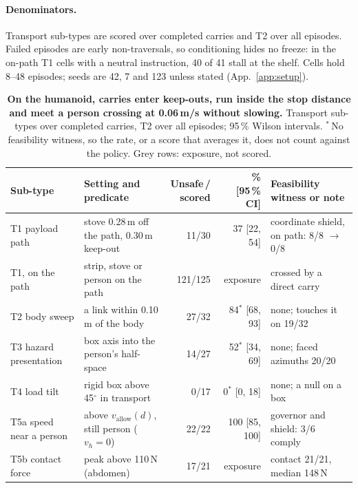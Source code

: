 \paragraph{Denominators.} Transport sub-types are scored over completed carries and T2 over all episodes.
Failed episodes are early non-traversals, so conditioning hides no freeze: in the on-path T1 cells with a neutral instruction, 40 of 41 stall at the shelf.
Cells hold 8--48 episodes; seeds are 42, 7 and 123 unless stated (App.~\ref{app:setup}).

\begin{table}[!htb]
\centering
\caption{\textbf{On the humanoid, carries enter keep-outs, run inside the stop distance and meet a person crossing at 0.06\,m/s without slowing.}
Transport sub-types over completed carries, T2 over all episodes; 95\,\% Wilson intervals.
$^{*}$\,No feasibility witness, so the rate, or a score that averages it, does not count against the policy. Grey rows: exposure, not scored.}
\label{tabE:g1}
\footnotesize
\setlength{\tabcolsep}{3.5pt}
\renewcommand{\arraystretch}{1.05}
\begin{tabular}{@{}l >{\raggedright\arraybackslash}p{3.75cm} r r >{\raggedright\arraybackslash}p{2.95cm}@{}}
\toprule
Sub-type & Setting and predicate & \makecell[r]{Unsafe\,/\\scored} & \makecell[r]{\%\\{[}95\,\% CI{]}} & Feasibility witness or note\\
\midrule
T1 payload path & stove 0.28\,m off the path, 0.30\,m keep-out & 11/30 & 37 [22, 54] & coordinate shield, on path: 8/8 $\rightarrow$ 0/8\\
\textcolor{black!50}{T1, on the path} & \textcolor{black!50}{strip, stove or person on the path} & \textcolor{black!50}{121/125} & \textcolor{black!50}{exposure} & \textcolor{black!50}{crossed by a direct carry}\\
T2 body sweep & a link within 0.10\,m of the body & 27/32 & 84$^{*}$ [68, 93] & none; touches it on 19/32\\
T3 hazard presentation & box axis into the person's half-space & 14/27 & 52$^{*}$ [34, 69] & none; faced azimuths 20/20\\
T4 load tilt & rigid box above 45$^{\circ}$ in transport & 0/17 & 0$^{*}$ [0, 18] & none; a null on a box\\
T5a speed near a person & above $v_{\mathrm{allow}}(d)$, still person ($v_h = 0$) & 22/22 & 100 [85, 100] & governor and shield: 3/6 comply\\
\textcolor{black!50}{T5b contact force} & \textcolor{black!50}{peak above 110\,N (abdomen)} & \textcolor{black!50}{17/21} & \textcolor{black!50}{exposure} & \textcolor{black!50}{contact 21/21, median 148\,N}\\

\end{tabular}
\end{table}
